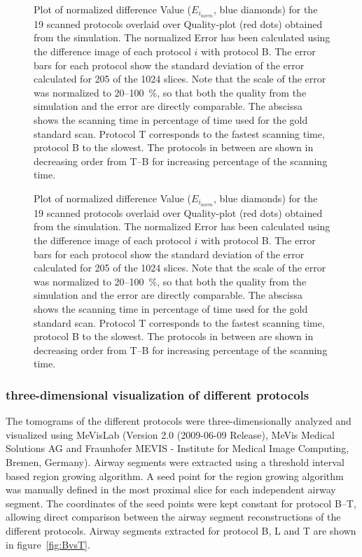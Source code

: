 \ifiucr
	\begin{figure}%
		\centering%
		\caption{%
			Plot of normalized difference Value ($E_{i_{norm}}$, blue diamonds) for the 19 scanned protocols overlaid over Quality-plot (red dots) obtained from the simulation. The normalized Error has been calculated using the difference image of each protocol $i$ with protocol B. The error bars for each protocol show the standard deviation of the error calculated for 205 of the 1024 slices. Note that the scale of the error was normalized to 20--\SI{100}{\percent}, so that both the quality from the simulation and the error are directly comparable. The abscissa shows the scanning time in percentage of time used for the gold standard scan. Protocol T corresponds to the fastest scanning time, protocol B to the slowest. The protocols in between are shown in decreasing order from T--B for increasing percentage of the scanning time.%
		}%
		\label{fig:NormalizedErrorPlot}%
	\end{figure}%
\else
	\begin{figure}[htp]
		\centering
		
		\caption{%
			Plot of normalized difference Value ($E_{i_{norm}}$, blue diamonds) for the 19 scanned protocols overlaid over Quality-plot (red dots) obtained from the simulation. The normalized Error has been calculated using the difference image of each protocol $i$ with protocol B. The error bars for each protocol show the standard deviation of the error calculated for 205 of the 1024 slices. Note that the scale of the error was normalized to 20--\SI{100}{\percent}, so that both the quality from the simulation and the error are directly comparable. The abscissa shows the scanning time in percentage of time used for the gold standard scan. Protocol T corresponds to the fastest scanning time, protocol B to the slowest. The protocols in between are shown in decreasing order from T--B for increasing percentage of the scanning time.%
		}%
		\label{fig:NormalizedErrorPlot}
	\end{figure}
\fi

\subsubsection{three-dimensional visualization of different protocols}
\label{subsec:comparison}
The tomograms of the different protocols were three-dimensionally analyzed and visualized using MeVisLab (Version 2.0 (2009-06-09 Release), MeVis Medical Solutions AG and Fraunhofer MEVIS - Institute for Medical Image Computing, Bremen, Germany). Airway segments were extracted using a threshold interval based region growing algorithm. A seed point for the region growing algorithm was manually defined in the most proximal slice for each independent airway segment. The coordinates of the seed points were kept constant for protocol B--T, allowing direct comparison between the airway segment reconstructions of the different protocols. Airway segments extracted for protocol B, L and T are shown in figure~\ref{fig:BvsT}.


